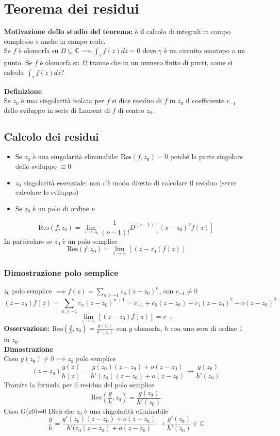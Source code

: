 \documentclass[a4paper]{article}
\newcommand{\C}{\mathbb{C}}
\begin{document}
\section{Teorema dei residui}
\textbf{Motivazione dello studio del teorema: }è il calcolo di integrali in campo complesso e anche in campo reale.
\\Se $f$ è olomorfa su $\Omega \subseteq  \C \implies \int_{\gamma}^{} f(z)dz=0$ dove $\gamma$ è un circuito omotopo a un punto.
Se $f$ è olomorfa su $\Omega$ tranne che in un numero finito di punti, come si calcola $\int_{\gamma}^{} f(z)dz$?
\begin{tcolorbox}
	\textbf{Definizione}\\ 
	Se $z_0$ è una singolarità isolata per $f$ si dice residuo di $f$ in $z_0$ il coefficiente $c_{-1}$ dello sviluppo in serie di Laurent di $f$ di centro $z_0$.
\end{tcolorbox}
\subsection{Calcolo dei residui}
\begin{itemize}
	\item Se $z_0$ è una singolarità eliminabile: $\text{Res}(f,z_0)=0$ poiché la parte singolare dello sviluppo $\equiv 0$
	\item $z_0$ singolarità essenziale: non c'è modo diretto di calcolare il residuo (serve calcolare lo sviluppo)
	\item Se $z_0$ è un polo di ordine $\nu$
\end{itemize}
\[\text{Res}(f,z_0)=\lim_{z \to z_0} \frac{1}{(\nu-1)!}D^{(\nu-1)}[(z-z_0)^\nu f(z)]\]
In particolare se $z_0$ è un polo semplice
\[\text{Res}(f,z_0)=\lim_{z \to z_0} [(z-z_0)f(z)]\]
\subsubsection*{Dimostrazione polo semplice}
$z_0$ polo semplice $\implies f(z)=\sum_{n\ge -1}^{} c_n(z-z_0)^n$, con $c_{-1}\neq  0$
\[(z-z_0)f(z)=\sum_{n\ge -1}^{} c_n(z-z_0)^{n+1}=c_{-1}+c_0(z-z_0)+c_1(z-z_0)^2+o(z-z_0)^2\]
\[\lim_{z \to z_0} [(z-z_0)f(z)]=c_{-1}\]
\textbf{Osservazione:} $\text{Res}(\frac{g}{h},z_0)=\frac{g(z_0)}{h'(z_0)}$ con $g$ olomorfa, $h$ con uno zero di ordine 1 in $z_0$.\\
\textbf{Dimostrazione}\\
Caso $g(z_0)\neq 0\implies z_0$ polo semplice 
\[(z-z_0) \frac{g(z)}{h(z)}= \frac{g(z_0)(z-z_0)+o(z-z_0)}{h'(z_0)(z-z_0)+o(z-z_0)}\to  \frac{g(z_0)}{h'(z_0)}\]
Tramite la formula per il residuo del polo semplice
\[\text{Res}( \frac{g}{h},z_0)= \frac{g(z_0)}{h'(z_0)}\]
Caso G(z0)=0
Dico che $z_0$ è una singolarità eliminabile
\[\frac{g}{h}= \frac{g'(z_0)(z-z_0)+o(z-z_0)}{h'(z_0(z-z_0)+o(z-z_0)}\to \frac{g'(z_0)}{h'(z_0)}\in\C\]
\end{document}

